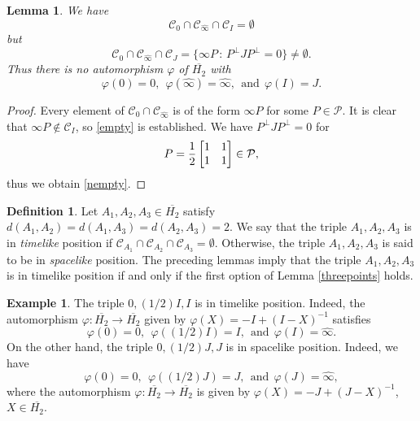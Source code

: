 \documentclass[10pt]{amsart}
\newtheorem{lemma}[theorem]{Lemma}
\theoremstyle{definition}
\newtheorem{definition}[theorem]{Definition}
\newtheorem{example}[theorem]{Example}
\theoremstyle{remark}
\newtheorem{remark}[theorem]{Remark}
\numberwithin{subsection}{section}
\numberwithin{equation}{section}
\newcommand\cC{{\mathcal{C}}}
\newcommand\cP{{\mathcal{P}}}
\newcommand\oH{{\overline{H_2}}}
\newcommand\oi{{\widehat{\infty}}}
\begin{document}
\begin{lemma}\label{noauto}
We have 
\begin{equation}\label{empty}
\cC_0\cap \cC_{\oi}\cap \cC_I=\emptyset
\end{equation}
but
\begin{equation}\label{nempty}
 \cC_0\cap \cC_{\oi}\cap \cC_J=\{\infty P\,:\, P^\perp JP^\perp =0\}\neq \emptyset.
\end{equation}
Thus there is no automorphism $\varphi$ of $\oH$ with 
\[
\varphi(0)=0,\ \ \varphi(\oi)=\oi,\ \  \text{and}\ \ \varphi(I)=J.
\] 
\end{lemma}
\begin{proof}
Every element of $\cC_0\cap \cC_{\oi}$ is of the form $\infty P$ for some $P\in \cP$. 
It is clear that $\infty P\notin \cC_I$, so \eqref{empty} is established. 
We have $P^\perp JP^\perp=0$ for 
\[
P=\frac{1}{2}\left[ \begin{matrix} 1 & 1 \cr 1 & 1 \cr \end{matrix} \right]\in \cP,
\]
thus we obtain \eqref{nempty}.
\end{proof}

\begin{definition}
Let $A_1 , A_2 , A_3 \in \oH$ satisfy $d(A_1 , A_2 ) = d(A_1 , A_3 ) = d(A_2 , A_3 ) = 2$. We say that the triple $A_1 , A_2 , A_3$ is in \emph{timelike} position  if $\cC_{A_1} \cap \cC_{A_2}\cap \cC_{A_3}=\emptyset$. Otherwise, the triple $A_1 , A_2 , A_3$ is said to be in \emph{spacelike} position.
The preceding lemmas imply that the triple $A_1 , A_2 , A_3$ is in timelike position if and only if the first option of Lemma \ref{threepoints} holds.
\end{definition}
%


\begin{example}\label{IJ}
The triple $0, (1/2)I, I$ is in timelike position. Indeed, the automorphism $\varphi \colon \oH \to \oH$ given by $\varphi (X) = -I + (I-X)^{-1}$ satisfies 
\[
\varphi (0) = 0,\ \ \varphi ((1/2)I) = I,\ \  \text{and}\ \ \varphi (I) = {\oi}.
\] 
On the other hand, the triple $0, (1/2)J, J$ is in spacelike position. Indeed, we have 
\[
\varphi (0) = 0,\ \ \varphi ((1/2)J) = J,\ \ \text{and}\ \ \varphi (J) = {\oi}, 
\]
where the automorphism $\varphi \colon \oH \to \oH$ is given by $\varphi (X) = -J + (J-X)^{-1}$, $X \in \oH$.
\end{example}
\end{document}
